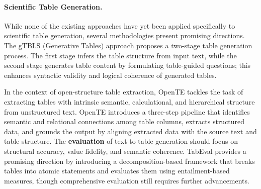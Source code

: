 \paragraph{Scientific %
Table 
Generation.} 

While none of the existing approaches have yet been applied specifically to scientific %
table generation, several methodologies present promising directions. %
% 
The gTBLS (Generative Tables) approach \citep{sundar2024gtbls} proposes a two-stage table generation process. The first stage infers the table structure from input text, while the second stage generates table content by formulating table-guided questions; %
this enhances %
syntactic validity and logical coherence of generated tables.  %
% 
\iffalse 
For domain-specific tasks, MedT2T \citep{ZHAO2024586} introduces an adaptive text-to-table generation method tailored to medical information extraction. %
It employs an Encoder-Decoder-Adapter architecture, where the adapter incorporates an adaptive pointer generation mechanism to accurately reference medical terms and numerical entities.
\fi 
% 
In the context of open-structure table extraction, OpenTE \citep{10448427} tackles the task of extracting tables with intrinsic semantic, calculational, and hierarchical structure from unstructured text. OpenTE introduces %
a three-step pipeline that identifies semantic and relational connections among table columns, extracts structured data, and grounds the output by aligning extracted data with the source text and table structure.
% 
The \textbf{evaluation} of text-to-table generation should focus on structural accuracy, value fidelity, and semantic coherence. TabEval \citep{ramu-etal-2024-bad} provides a promising direction by introducing a decomposition-based framework that breaks tables into atomic statements and evaluates them using entailment-based measures, though comprehensive evaluation still requires further advancements.


